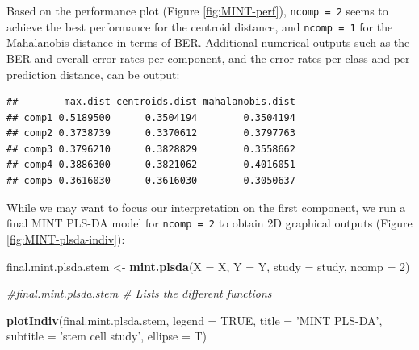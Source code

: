 \documentclass[]{book}
\newenvironment{Shaded}{\begin{snugshade}}{\end{snugshade}}
\newcommand{\KeywordTok}[1]{\textcolor[rgb]{0.13,0.29,0.53}{\textbf{#1}}}
\newcommand{\DataTypeTok}[1]{\textcolor[rgb]{0.13,0.29,0.53}{#1}}
\newcommand{\DecValTok}[1]{\textcolor[rgb]{0.00,0.00,0.81}{#1}}
\newcommand{\StringTok}[1]{\textcolor[rgb]{0.31,0.60,0.02}{#1}}
\newcommand{\CommentTok}[1]{\textcolor[rgb]{0.56,0.35,0.01}{\textit{#1}}}
\newcommand{\OtherTok}[1]{\textcolor[rgb]{0.56,0.35,0.01}{#1}}
\newcommand{\OperatorTok}[1]{\textcolor[rgb]{0.81,0.36,0.00}{\textbf{#1}}}
\newcommand{\NormalTok}[1]{#1}
\begin{document}
Based on the performance plot (Figure \ref{fig:MINT-perf}),
\texttt{ncomp\ =\ 2} seems to achieve the best performance for the
centroid distance, and \texttt{ncomp\ =\ 1} for the Mahalanobis distance
in terms of BER. Additional numerical outputs such as the BER and
overall error rates per component, and the error rates per class and per
prediction distance, can be output:

\begin{Shaded}
\end{Shaded}

\begin{verbatim}
##        max.dist centroids.dist mahalanobis.dist
## comp1 0.5189500      0.3504194        0.3504194
## comp2 0.3738739      0.3370612        0.3797763
## comp3 0.3796210      0.3828829        0.3558662
## comp4 0.3886300      0.3821062        0.4016051
## comp5 0.3616030      0.3616030        0.3050637
\end{verbatim}

While we may want to focus our interpretation on the first component, we
run a final MINT PLS-DA model for \texttt{ncomp\ =\ 2} to obtain 2D
graphical outputs (Figure \ref{fig:MINT-plsda-indiv}):

\begin{Shaded}
\begin{Highlighting}[]
\NormalTok{final.mint.plsda.stem <-}\StringTok{ }\KeywordTok{mint.plsda}\NormalTok{(}\DataTypeTok{X =}\NormalTok{ X, }\DataTypeTok{Y =}\NormalTok{ Y, }\DataTypeTok{study =}\NormalTok{ study, }\DataTypeTok{ncomp =} \DecValTok{2}\NormalTok{)}

\CommentTok{#final.mint.plsda.stem # Lists the different functions}

\KeywordTok{plotIndiv}\NormalTok{(final.mint.plsda.stem, }\DataTypeTok{legend =} \OtherTok{TRUE}\NormalTok{, }\DataTypeTok{title =} \StringTok{'MINT PLS-DA'}\NormalTok{, }
          \DataTypeTok{subtitle =} \StringTok{'stem cell study'}\NormalTok{, }\DataTypeTok{ellipse =}\NormalTok{ T)}
\end{Highlighting}
\end{Shaded}
\end{document}
